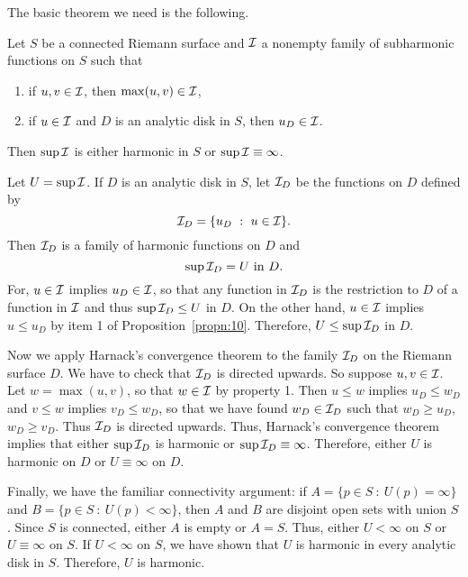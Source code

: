 \documentclass[a4paper,11pt]{article}
\begin{document}
The basic theorem we need is the following.

\begin{thm}
  \label{thm:5}
  Let $S$ be a connected Riemann surface and ${\mathcal{I}}$ a nonempty family
  of subharmonic functions on $S$ such that
  \begin{enumerate}
  \item if $u, v \in {\mathcal{I}}$, then $\max(u,v) \in {\mathcal{I}}$,
  \item if $u \in {\mathcal{I}}$ and $D$ is an analytic disk in $S$, then $u_D
    \in {\mathcal{I}}$.
  \end{enumerate}
  Then $\sup {\mathcal{I}}$ is either harmonic in $S$ or $\sup {\mathcal{I}} \equiv
  \infty$.
\end{thm}

\begin{myproof}
  Let $U = \sup {\mathcal{I}}$.  If $D$ is an analytic disk in $S$, let
  ${\mathcal{I}}_D$ be the functions on $D$ defined by
  $$
  {\mathcal{I}}_D = \{u_D ~:~ u \in {\mathcal{I}}\}.
  $$
  Then ${\mathcal{I}}_D$ is a family of harmonic functions on $D$ and
  $$
  \sup {\mathcal{I}}_D = U\text{ in }D.
  $$
  For, $u \in {\mathcal{I}}$ implies $u_D \in {\mathcal{I}}$, so that any function in
  ${\mathcal{I}}_D$ is the restriction to $D$ of a function in ${\mathcal{I}}$ and
  thus $\sup {\mathcal{I}}_D \le U$ in $D$.  On the other hand, $u \in {\mathcal{I}}$
  implies $u \le u_D$ by item 1 of Proposition~\ref{propn:10}.
  Therefore, $U \le \sup {\mathcal{I}}_D$ in $D$.

  Now we apply Harnack's convergence theorem to the family ${\mathcal{I}}_D$
  on the Riemann surface $D$.  We have to check that ${\mathcal{I}}_D$ is
  directed upwards.  So suppose $u,v \in {\mathcal{I}}$.  Let $w = \max(u,v)$,
  so that $w \in {\mathcal{I}}$ by property 1.  Then $u \le w$ implies $u_D
  \le w_D$ and $v \le w$ implies $v_D \le w_D$, so that we have found
  $w_D \in {\mathcal{I}}_D$ such that $w_D \ge u_D$, $w_D \ge v_D$.  Thus
  ${\mathcal{I}}_D$ is directed upwards.  Thus, Harnack's convergence theorem
  implies that either $\sup {\mathcal{I}}_D$ is harmonic or $\sup {\mathcal{I}}_D
  \equiv \infty$.  Therefore, either $U$ is harmonic on $D$ or $U
  \equiv \infty$ on $D$.

  Finally, we have the familiar connectivity argument: if $A = \{p \in
  S ~:~ U(p) = \infty\}$ and $B = \{p \in S ~:~ U(p) < \infty\}$, then
  $A$ and $B$ are disjoint open sets with union $S$.  Since $S$ is
  connected, either $A$ is empty or $A = S$.  Thus, either $U <
  \infty$ on $S$ or $U \equiv \infty$ on $S$.  If $U < \infty$ on $S$,
  we have shown that $U$ is harmonic in every analytic disk in $S$.
  Therefore, $U$ is harmonic.
\end{myproof}
\end{document}
